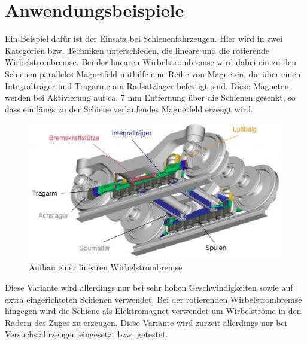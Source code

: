 \section{Anwendungsbeispiele}

Ein Beispiel dafür ist der Einsatz bei Schienenfahrzeugen. Hier wird in zwei
Kategorien bzw. Techniken unterschieden, die lineare und die rotierende Wirbelstrombremse.
Bei der linearen Wirbelstrombremse wird dabei ein zu den Schienen paralleles
Magnetfeld mithilfe eine Reihe von Magneten, die über einen Integralträger und
Tragärme am Radsatzlager befestigt sind. Diese Magneten werden bei Aktivierung
auf ca. 7 mm Entfernung über die Schienen gesenkt, so dass ein längs zu der Schiene
verlaufendes Magnetfeld erzeugt wird.

\begin{figure}
  \centering
  \includegraphics[width=\textwidth]{Wirbelstrombremse_Aufbau.jpg}
  \caption{Aufbau einer linearen Wirbelstrombremse}
  \label{fig:linWAufbau}
\end{figure}

Diese Variante
wird allerdings nur bei sehr hohen Geschwindigkeiten sowie auf extra eingerichteten
Schienen verwendet.
Bei der rotierenden Wirbelstrombremse hingegen wird die Schiene als Elektromagnet
verwendet um Wirbelströme in den Rädern des Zuges zu erzeugen. Diese Variante wird
zurzeit allerdings nur bei Versuchsfahrzeugen eingesetzt bzw. getestet.



